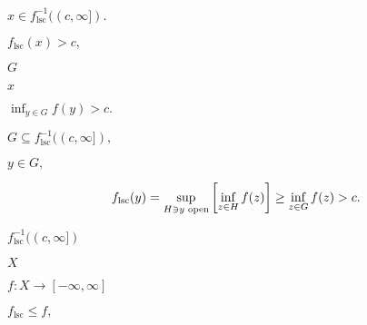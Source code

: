 \documentclass[10pt]{book}
\begin{document}
\begin{mdSnippets}
\begin{mdInlineSnippet}[dda33429d47a479bd58c90c028c6a8dc]
$x \in f_\text{lsc}^{-1}((c, \infty]).$\end{mdInlineSnippet}%
\begin{mdInlineSnippet}%
$f_\text{lsc}(x) > c,$\end{mdInlineSnippet}%
\begin{mdInlineSnippet}[dfcf28d0734569a6a693bc8194de62bf]%
$G$\end{mdInlineSnippet}%
\begin{mdInlineSnippet}[9dd4e461268c8034f5c8564e155c67a6]%
$x$\end{mdInlineSnippet}%
\begin{mdInlineSnippet}[fa6df5e05607277312d1916fbcb7e7f6]%
$\inf_{y \in G} f(y) > c.$\end{mdInlineSnippet}%
\begin{mdInlineSnippet}%
$G \subseteq f_\text{lsc}^{-1}((c, \infty]),$\end{mdInlineSnippet}%
\begin{mdInlineSnippet}[714cc660bd6eeb3c898a5b3a78bb1400]%
$y \in G,$\end{mdInlineSnippet}%
\begin{mdDisplaySnippet}%
\[%
f_\text{lsc}(y) = \sup_{H \ni y \text{ open}} \qty[\inf_{z \in H} f(z)]
\ge \inf_{z \in G} f(z) > c.
\]%
\end{mdDisplaySnippet}%
\begin{mdInlineSnippet}[9a7859563ae8bcfe2b67b09eb067e6f0]%
$f_\text{lsc}^{-1}((c, \infty])$\end{mdInlineSnippet}%
\begin{mdInlineSnippet}[02129bb861061d1a052c592e2dc6b383]%
$X$\end{mdInlineSnippet}%
\begin{mdInlineSnippet}[9c3729f1b2ef77b97bbdb1135d803c69]%
$f: X \to [-\infty, \infty]$\end{mdInlineSnippet}%
\begin{mdInlineSnippet}[06a6e69dcb4d7663fa24e77924a01c93]%
$f_\text{lsc} \le f,$\end{mdInlineSnippet}%
\begin{mdInlineSnippet}%

\end{mdInlineSnippet}
\end{mdSnippets}
\end{document}
